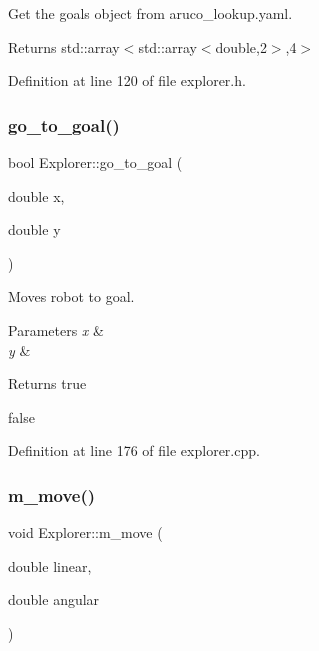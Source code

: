 Get the goals object from aruco\+\_\+lookup.\+yaml. 

\begin{DoxyReturn}{Returns}
std\+::array$<$std\+::array$<$double,2$>$,4$>$ 
\end{DoxyReturn}


Definition at line 120 of file explorer.\+h.

\mbox{\label{class_explorer_aa1e259feaac1114adb0f24588428e8ef}} 
\subsubsection{\texorpdfstring{go\+\_\+to\+\_\+goal()}{go\_to\_goal()}}
{\footnotesize\ttfamily bool Explorer\+::go\+\_\+to\+\_\+goal (\begin{DoxyParamCaption}\item[{double}]{x,  }\item[{double}]{y }\end{DoxyParamCaption})}



Moves robot to goal. 


\begin{DoxyParams}{Parameters}
{\em x} & \\
\hline
{\em y} & \\
\hline
\end{DoxyParams}
\begin{DoxyReturn}{Returns}
true 

false 
\end{DoxyReturn}


Definition at line 176 of file explorer.\+cpp.

\mbox{\label{class_explorer_ace304ef65547f4a3ff6458d934c54e87}} 
\subsubsection{\texorpdfstring{m\+\_\+move()}{m\_move()}}
{\footnotesize\ttfamily void Explorer\+::m\+\_\+move (\begin{DoxyParamCaption}\item[{double}]{linear,  }\item[{double}]{angular }\end{DoxyParamCaption})}




